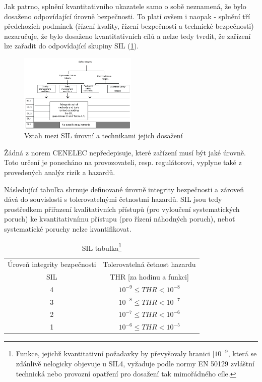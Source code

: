       Jak patrno, splnění kvantitativního ukazatele samo o sobě neznamená, že bylo dosaženo
      odpovídající úrovně bezpečnosti. To platí ovšem i naopak - splnění tří předchozích podmínek
      (řízení kvality, řízení bezpečnosti a technické bezpečnosti) nezaručuje, že bylo dosaženo
      kvantitativních cílů a nelze tedy tvrdit, že zařízení lze zařadit do odpovídající skupiny
      SIL (\ref{DZT:fig_EN50129_SIL_techniques}).
      
      \begin{figure}[hb!]%
        \centering
        \includegraphics[width=0.5\textwidth]{EN50129_SIL_techniques.pdf}
        \caption{Vztah mezi SIL úrovní a technikami jejich dosažení}
        \label{DZT:fig_EN50129_SIL_techniques}
      \end{figure}
      
      Žádná z norem CENELEC nepředepisuje, které zařízení musí být jaké úrovně. Toto určení je 
      ponecháno na provozovateli, resp. regulátorovi, vyplyne také z provedených analýz rizik 
      a hazardů.
      
      Následující tabulka shrnuje definované úrovně integrity bezpečnosti a zároveň dává do souvislosti s tolerovatelnými četnostmi hazardů. SIL jsou tedy prostředkem přiřazení kvalitativních přístupů (pro vyloučení systematických poruch) ke kvantitativnímu přístupu (pro řízení náhodných poruch), neboť systematické poruchy nelze kvantifikovat. 
      \begin{table}[h]
        \begin{tabular}{|c|c|}
          \hline
           Úroveň integrity 
           bezpečnosti &  Tolerovatelná četnost hazardu   \\          
             SIL       &   THR [za hodinu a funkci]       \\ \hline\hline 
              4        & \(10^{-9}\leq THR < 10^{-8}\)    \\ \hline
              3        & \(10^{-8}\leq THR < 10^{-7}\)    \\ \hline
              2        & \(10^{-7}\leq THR < 10^{-6}\)    \\ \hline
              1        & \(10^{-6}\leq THR < 10^{-5}\)    \\ \hline
        \end{tabular}
        \caption{SIL tabulka\footnote{Funkce, jejichž kvantitativní požadavky by převyšovaly 
                 hranici |\(10^{-9}\), která se zdánlivě nelogicky objevuje u SIL4, vyžaduje
                 podle normy EN 50129 zvláštní technická nebo provozní opatření pro dosažení
                 tak mimořádného cíle.}}
      \end{table}
       
